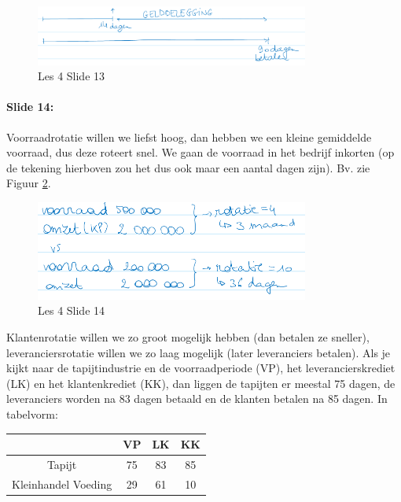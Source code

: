 \documentclass[10pt,a4paper]{report}
\begin{document}
\begin{figure}[h!]
\centering
\includegraphics[width=90mm]{Les04_01.png}
\caption{Les 4 Slide 13} 
\label{les04_01}
\end{figure}

\paragraph{Slide 14:} Voorraadrotatie willen we liefst hoog, dan hebben we een kleine gemiddelde voorraad, dus deze roteert snel. We gaan de voorraad in het bedrijf inkorten (op de tekening hierboven zou het dus ook maar een aantal dagen zijn). Bv. zie Figuur \ref{les04_02}.

\begin{figure}[h!]
\centering
\includegraphics[width=90mm]{Les04_02.png}
\caption{Les 4 Slide 14} 
\label{les04_02}
\end{figure}

Klantenrotatie willen we zo groot mogelijk hebben (dan betalen ze sneller), leveranciersrotatie willen we zo laag mogelijk (later leveranciers betalen). 
Als je kijkt naar de tapijtindustrie en de voorraadperiode (VP),  het leverancierskrediet (LK) en het klantenkrediet (KK), dan liggen de tapijten er meestal 75 dagen, de leveranciers worden na 83 dagen betaald en de klanten betalen na 85 dagen. In tabelvorm:


\begin{table}[h!]
\centering
\begin{tabular}{|c||c|c|c|}
\hline                         										
		 				&	VP 		&	LK		&	KK		\\	\hline	\hline
Tapijt					&	75		&	83		&	85		\\	\hline
Kleinhandel Voeding		&	29		&	61		&	10		\\	\hline

\end{tabular}
\label{les4_slide14}
\end{table}
\end{document}
